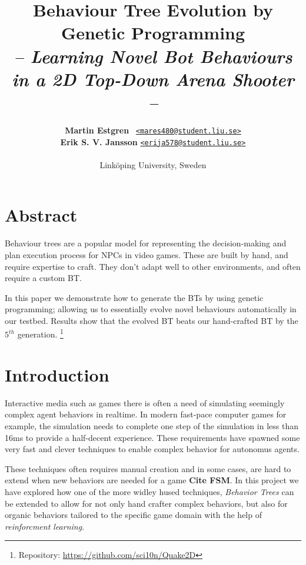 \documentclass[a4paper, twocolumn]{article}
\title{\textbf{Behaviour Tree Evolution by Genetic Programming}\\
       \Large{\emph{-- Learning Novel Bot Behaviours in a 2D Top-Down Arena Shooter --}}}
\author{{\textbf{Martin Estgren}} \;\;\;\;\;\;\;\;\;\, {\href{mailto:mares480@student.liu.se}
                                                       {\texttt{<mares480@student.liu.se>}}} \\
        {\textbf{Erik S. V. Jansson}} \;\;\;\;         {\href{mailto:erija578@student.liu.se}
                                                       {\texttt{<erija578@student.liu.se>}}} \\~\\
        {Linköping University, Sweden}\vspace{-2.0ex}}
\begin{document}
    \maketitle
    \section*{Abstract}

    Behaviour trees are a popular model for representing the decision-making and plan execution process for NPCs in video games. These are built by hand, and require expertise to craft. They don't adapt well to other environments, and often require a custom BT.

    In this paper we demonstrate how to generate the BTs by using genetic programming; allowing us to essentially evolve novel behaviours automatically in our testbed. Results show that the evolved BT beats our hand-crafted BT by the \(5^{th}\) generation. \footnote{Repository: \url{https://github.com/sci10n/Quake2D}}

    \vspace{1.8em}

    \begingroup
    \def\addvspace#1{}
    \tableofcontents
    \endgroup
    \newpage

    \newpage %
    \nocite{*} %
    
    
    \clearpage

    \section{Introduction} \label{sec:introduction}
	
	Interactive media such as games there is often a need of simulating seemingly complex agent behaviors in realtime. In modern fast-pace computer games for example, the simulation needs to complete one step of the simulation in less than 16ms to provide a half-decent experience. These requirements have spawned some very fast and clever techniques to enable complex behavior for autonomus agents.

	These techniques often requires manual creation and in some cases, are hard to extend when new behaviors are needed for a game \textbf{Cite FSM}. In this project we have explored how one of the more widley hused techniques, \emph{Behavior Trees} can be extended to allow for not only hand crafter complex behaviors, but also for organic behaviors tailored to the specific game domain with the help of \emph{reinforcment learning}.
\end{document}
